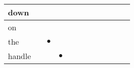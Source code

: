 \documentclass[landscape]{article}
\newcommand{\ssp}{\hspace{2pt}}
\newcommand{\mex}{\cellcolor{g}$\bullet$}
\begin{document}
\begin{tabular}{|l|p{10pt}|p{10pt}|p{10pt}|p{10pt}|p{10pt}|p{10pt}|p{10pt}|p{10pt}|p{10pt}|p{10pt}|p{10pt}|}
\hline
\ssp down \ssp&\hspace{2pt}&\hspace{2pt}&\hspace{2pt}&\hspace{2pt}&\hspace{2pt}&\hspace{2pt}&\hspace{2pt}&\hspace{2pt}&\hspace{2pt}&\hspace{2pt}&\hspace{2pt}\\
\hline
\ssp on \ssp&\hspace{2pt}&\hspace{2pt}&\hspace{2pt}&\hspace{2pt}&\hspace{2pt}&\hspace{2pt}&\hspace{2pt}&\hspace{2pt}&\hspace{2pt}&\hspace{2pt}&\hspace{2pt}\\
\hline
\ssp \cellcolor{ref1}the \ssp&\hspace{2pt}&\hspace{2pt}\mex&\hspace{2pt}&\hspace{2pt}&\hspace{2pt}&\hspace{2pt}&\hspace{2pt}&\hspace{2pt}&\hspace{2pt}&\hspace{2pt}&\hspace{2pt}\\
\hline
\ssp \cellcolor{ref2}handle \ssp&\hspace{2pt}&\hspace{2pt}&\hspace{2pt}\mex&\hspace{2pt}&\hspace{2pt}&\hspace{2pt}&\hspace{2pt}&\hspace{2pt}&\hspace{2pt}&\hspace{2pt}&\hspace{2pt}\\

\end{tabular}
\end{document}
